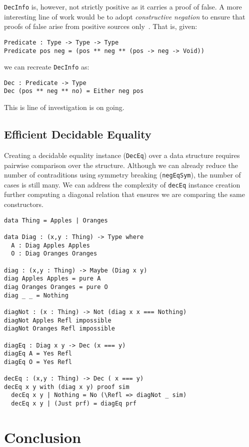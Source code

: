 \documentclass[%
draft,
a4paper,
UKenglish,
cleveref,
autoref,
thm-restate,
pdfa
]{oasics-v2021}
\begin{document}
\texttt{DecInfo} is, however, not strictly positive as it carries a proof of false.
A more interesting line of work would be to adopt \emph{constructive negation} to ensure that proofs of false arise from positive sources only~\cite{msfp/Atkey22}.
That is, given:

\begin{verbatim}
Predicate : Type -> Type -> Type
Predicate pos neg = (pos ** neg ** (pos -> neg -> Void))
\end{verbatim}

we can recreate \texttt{DecInfo} as:


\begin{verbatim}
Dec : Predicate -> Type
Dec (pos ** neg ** no) = Either neg pos
\end{verbatim}

This is line of investigation is on going.

\subsection{Efficient Decidable Equality}
\label{sec:idioms:decEq}



Creating a decidable equality instance (\texttt{DecEq}) over a data structure requires pairwise comparison over the structure.
Although we can already reduce the number of contraditions using symmetry breaking (\texttt{negEqSym}), the number of cases is still many.
We can address the complexity of \texttt{decEq} instance creation further computing a diagonal relation that ensures we are comparing the same constructors.


\begin{verbatim}
data Thing = Apples | Oranges

data Diag : (x,y : Thing) -> Type where
  A : Diag Apples Apples
  O : Diag Oranges Oranges

diag : (x,y : Thing) -> Maybe (Diag x y)
diag Apples Apples = pure A
diag Oranges Oranges = pure O
diag _ _ = Nothing

diagNot : (x : Thing) -> Not (diag x x === Nothing)
diagNot Apples Refl impossible
diagNot Oranges Refl impossible

diagEq : Diag x y -> Dec (x === y)
diagEq A = Yes Refl
diagEq O = Yes Refl

decEq : (x,y : Thing) -> Dec ( x === y)
decEq x y with (diag x y) proof sim
  decEq x y | Nothing = No (\Refl => diagNot _ sim)
  decEq x y | (Just prf) = diagEq prf
\end{verbatim}

\section{Conclusion}
\label{sec:conclusion}



\end{document}

